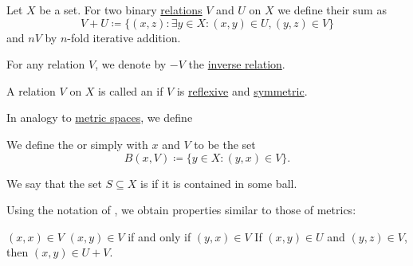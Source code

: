\begin{definition}\label{def:entourage}
  Let \( X \) be a set. For two binary \hyperref[def:relation]{relations} \( V \) and \( U \) on \( X \) we define their sum as
  \begin{equation*}
    V + U \coloneqq \{ (x, z) \colon \exists y \in X: (x, y) \in U, (y, z) \in V \}
  \end{equation*}
  and \( nV \) by \( n \)-fold iterative addition.

  For any relation \( V \), we denote by \( -V \) the \hyperref[def:binary_relation/inverse]{inverse relation}.

  A relation \( V \) on \( X \) is called an  if \( V \) is \hyperref[def:binary_relation/reflexive]{reflexive} and \hyperref[def:binary_relation/symmetric]{symmetric}.

  In analogy to \hyperref[def:metric_space]{metric spaces}, we define
  \begin{thmenum}
     We define the  or simply  with  \( x \) and  \( V \) to be the set
    \begin{equation*}
      B(x, V) \coloneqq \{ y \in X \colon (y, x) \in V \}.
    \end{equation*}

     We say that the set \( S \subseteq X \) is  if it is contained in some ball.
  \end{thmenum}
\end{definition}

\begin{proposition}\label{thm:entourage_simulates_metric}
  Using the notation of , we obtain properties similar to those of metrics:
  \begin{thmenum}
     \( (x, x) \in V \)
     \( (x, y) \in V \) if and only if \( (y, x) \in V \)
     If \( (x, y) \in U \) and \( (y, z) \in V \), then \( (x, y) \in U + V \).
  \end{thmenum}
\end{proposition}

